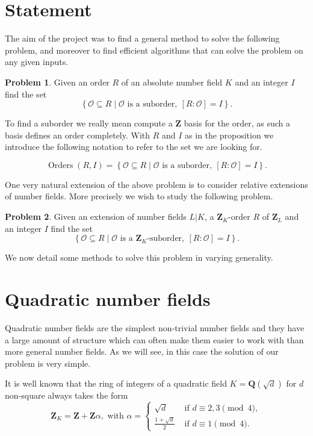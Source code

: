 \documentclass[12pt,a4paper,abstracton,bibtotoc]{scrreprt}
\theoremstyle{definition}
\newtheorem{prob}{Problem}
\newcommand{\QQ}{\mathbf{Q}}
\newcommand{\ZZ}{\mathbf{Z}}
\renewcommand{\O}{\mathcal{O}}
\DeclareMathOperator{\Orders}{Orders}
\begin{document}
\section{Statement}
\label{sec:statements}

The aim of the project was to find a general method to solve the following problem, and moreover to find efficient algorithms that can solve the problem on any given inputs.

\begin{prob}
Given an order $R$ of an absolute number field $K$ and an integer $I$ find the set
\[\left\{ \O\subseteq R \mid \O\text{ is a suborder},\ [R:\O] = I\right\}.\]
\end{prob}

To find a suborder we really mean compute a $\ZZ$ basis for the order, as such a basis defines an order completely.
With $R$ and $I$ as in the proposition we introduce the following notation to refer to the set we are looking for.

\[\Orders(R,I) = \left\{ \O\subseteq R \mid \O\text{ is a suborder},\ [R:\O] = I\right\}.\]

\minisec{}
One very natural extension of the above problem is to consider relative extensions of number fields.
More precisely we wish to study the following problem.

\begin{prob} %
Given an extension of number fields $L|K$, a $\ZZ_K$-order $R$ of $\ZZ_L$ and an integer $I$ find the set
\[\left\{ \O\subseteq R \mid \O\text{ is a $\ZZ_K$-suborder},\ [R:\O] = I\right\}.\]
\end{prob}

We now detail some methods to solve this problem in varying generality.

\section{Quadratic number fields}

Quadratic number fields are the simplest non-trivial number fields and they have a large amount of structure which can often make them easier to work with than more general number fields.
As we will see, in this case the solution of our problem is very simple.

It is well known \cite{lang} that the ring of integers of a quadratic field $K = \QQ(\sqrt{d})$ for $d$ non-square always takes the form
\[\ZZ_K = \ZZ + \ZZ\alpha,\text{ with } \alpha =\begin{cases}
\sqrt{d}&\text{ if $d\equiv 2,3\pmod{4}$},\\
\frac{1+\sqrt{d}}{2}&\text{ if $d\equiv 1\pmod{4}$}.
\end{cases}\]
\end{document}
